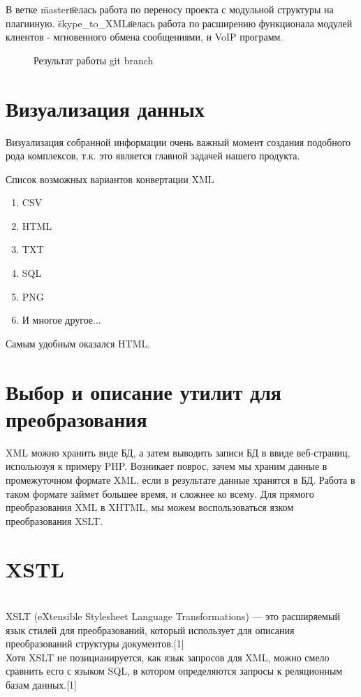  В ветке \"master\" велась работа по переносу проекта с модульной структуры на плагииную. \"skype_to_XML\" велась работа по расширению функционала модулей клиентов - мгновенного обмена сообщениями, и VoIP программ. 

\begin{figure}[h]
\caption{Результат работы git branch}
\label{pic:branch_project}
\end{figure}

\chapter*{Визуализация данных}
Визуализация собранной информации очень важный момент создания подобного рода комплексов, т.к. это является главной задачей нашего продукта. 

Список возможных вариантов конвертации XML
\begin{enumerate}
\item CSV
\item HTML
\item TXT
\item SQL
\item PNG
\item И многое другое...
\end{enumerate}
Самым удобным оказался HTML.
\chapter*{Выбор и описание утилит для преобразования}

XML можно хранить виде БД, а затем выводить записи БД в ввиде веб-страниц, испольюзуя к примеру PHP. Возникает поврос, зачем мы храним данные в промежуточном формате XML, если в результате данные хранятся в БД. Работа в таком формате займет большее время, и сложнее ко всему. Для прямого преобразования XML в XHTML, мы можем воспользоваться язком преобразования XSLT. 
\chapter*{XSTL}
\\XSLT (eXtensible Stylesheet Language Transformations) — это расширяемый язык стилей для преобразований, который использует для описания преобразований структуры документов.[1]
\\Хотя XSLT не позицианируется, как язык запросов для XML, можно смело сравнить есго с языком SQL, в котором определяются запросы к реляционным базам данных.[1]


